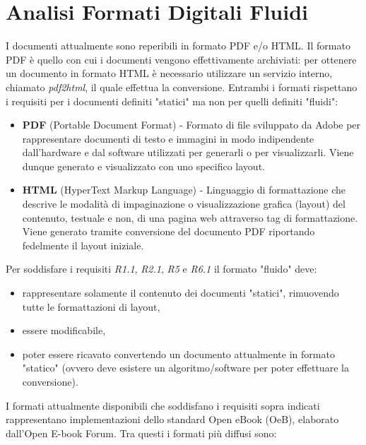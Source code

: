 \section{Analisi Formati Digitali Fluidi}
I documenti attualmente sono reperibili in formato PDF e/o HTML. Il formato PDF è quello con cui i documenti vengono effettivamente archiviati: per ottenere un documento in formato HTML è necessario utilizzare un servizio interno, chiamato \textit{pdf2html}, il quale effettua la conversione. Entrambi i formati rispettano i requisiti per i documenti definiti "statici" ma non per quelli definiti "fluidi":
\begin{itemize}
    \item \textbf{PDF} (Portable Document Format) - Formato di file sviluppato da Adobe per rappresentare documenti di testo e immagini in modo indipendente dall'hardware e dal software utilizzati per generarli o per visualizzarli. Viene dunque generato e visualizzato con uno specifico layout.
    \item \textbf{HTML} (HyperText Markup Language) - Linguaggio di formattazione che descrive le modalità di impaginazione o visualizzazione grafica (layout) del contenuto, testuale e non, di una pagina web attraverso tag di formattazione. Viene generato tramite conversione del documento PDF riportando fedelmente il layout iniziale.
\end{itemize}
Per soddisfare i requisiti \textit{R1.1}, \textit{R2.1}, \textit{R5} e \textit{R6.1} il formato "fluido" deve:
\begin{itemize}
    \item rappresentare solamente il contenuto dei documenti "statici", rimuovendo tutte le formattazioni di layout,
    \item essere modificabile,
    \item poter essere ricavato convertendo un documento attualmente in formato "statico" (ovvero deve esistere un algoritmo/software per poter effettuare la conversione).
\end{itemize}
I formati attualmente disponibili che soddisfano i requisiti sopra indicati rappresentano implementazioni dello standard Open eBook (OeB), elaborato dall'Open E-book Forum. Tra questi i formati più diffusi sono:
